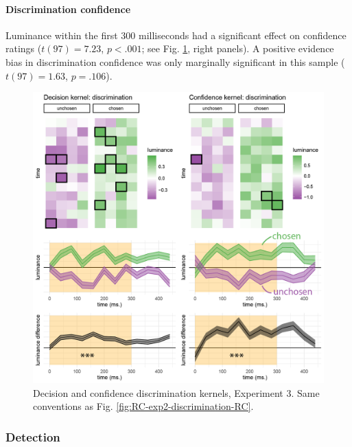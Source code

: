 \documentclass[12pt,twoside]{reedthesis}
\begin{document}
\hypertarget{discrimination-confidence-1}{%
\paragraph*{Discrimination confidence}\label{discrimination-confidence-1}}

Luminance within the first 300 milliseconds had a significant effect on confidence ratings (\(t(97) = 7.23\), \(p < .001\); see Fig. \ref{fig:RC-exp3-discrimination-RC}, right panels). A positive evidence bias in discrimination confidence was only marginally significant in this sample (\(t(97) = 1.63\), \(p = .106\)).


\begin{figure}
\includegraphics[width=\textwidth]{figure/RC/RC-exp3-discrimination-RC-enhanced} \caption[Decision kernels in discrimination, Exp. 3]{Decision and confidence discrimination kernels, Experiment 3. Same conventions as Fig. \ref{fig:RC-exp2-discrimination-RC}.}\label{fig:RC-exp3-discrimination-RC}
\end{figure}
\hypertarget{detection-1}{%
\subsubsection{Detection}\label{detection-1}}
\end{document}
